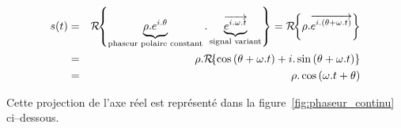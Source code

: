 \begin{remarque}
  \begin{eqnarray*}
    \label{eq:phaseur_rho_theta}
    s(t) &= & \mathcal{R}\!\!\left\{\underbrace{\rho.e^{i.\theta}}_{\text{phaseur polaire constant}}.\underbrace{\overrightarrow{e^{i.\omega.t}}}_{\text{signal variant}}\right\} = \mathcal{R}\!\!\left\{\rho.\overrightarrow{e^{i.\left(\theta +\omega.t\right)}}\right\}\\
         &=& \rho. \mathcal{R}\!\!\left\{\cos\left(\theta +\omega.t\right) + i.\sin\left(\theta +\omega.t\right) \right\} \\
         &=& \rho.\cos\left(\omega.t+\theta\right)
  \end{eqnarray*}
  
  Cette projection de l'axe réel est représenté dans la figure~\ref{fig:phaseur_continu} ci--dessous.
  
  


 \end{remarque}

    
    


